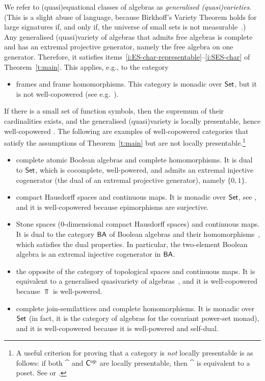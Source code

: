 \documentclass[a4paper,10pt,reqno]{amsart}
\theoremstyle{definition}
\theoremstyle{remark}
\begin{document}
We refer to (quasi)equational classes of algebras as \emph{generalised (quasi)varieties}. (This is a slight abuse of language, because Birkhoff's Variety Theorem holds for large signatures if, and only if, the universe of small sets is not measurable~\cite{AT2005}.)
%
Any generalised (quasi)variety of algebras that admits free algebras is complete and has an extremal projective generator, namely the free algebra on one generator.
Therefore, it satisfies items~\ref{i:ES-char-representable}--\ref{i:SES-char} of Theorem~\ref{t:main}. This applies, e.g., to the category

\begin{itemize}
	\item[$\Frm$:] frames and frame homomorphisms.  This category is monadic over ${\sf Set}$, but it is not well-copowered (see e.g.\ \cite[\S IV.6.6]{PP2012}).
\end{itemize}

If there is a small set of function symbols, then the supremum of their cardinalities exists, and the generalised (quasi)variety is locally presentable, hence well-copowered \cite[Theorem~1.58]{ar94book}. The following are examples of well-copowered categories that satisfy the assumptions of Theorem~\ref{t:main} but are not locally presentable.\footnote{A useful criterion for proving that a category is \emph{not} locally presentable is as follows: if both $\cat$ and ${\sf C}^{{\mathrm{op}}}$ are locally presentable, then $\cat$ is equivalent to a poset. See \cite[Satz~7.13]{GabrielUlmer1971} or \cite[Theorem~1.64]{ar94book}.}

\begin{itemize}
\item[$\CABA$:] complete atomic Boolean algebras and complete homomorphisms. It is dual to ${\sf Set}$, which is cocomplete, well-powered, and admits an extremal injective cogenerator (the dual of an extremal projective generator), namely $\{0,1\}$.
\item[$\CH$:] compact Hausdorff spaces and continuous maps. It is monadic over ${\sf Set}$, see \cite{Manes1976}, and it is well-copowered because epimorphisms are surjective.
\item[$\Stone$:] Stone spaces ($0$-dimensional compact Hausdorff spaces) and continuous maps. It is dual to the category ${\sf BA}$ of Boolean algebras and their homomorphisms~\cite{Stone1936}, which satisfies the dual properties. In particular, the two-element Boolean algebra is an extremal injective cogenerator in ${\sf BA}$.
\item[$\Top^\op$:] the opposite of the category of topological spaces and continuous maps. It is equivalent to a generalised quasivariety of algebras~\cite{BP1995}, and it is well-copowered because $\Top$ is well-powered.
\item[$\CSLat$:] complete join-semilattices and complete homomorphisms. It is monadic over ${\sf Set}$ (in fact, it is the category of algebras for the covariant power-set monad), and it is well-copowered because it is well-powered and self-dual.
\end{itemize}
\end{document}
